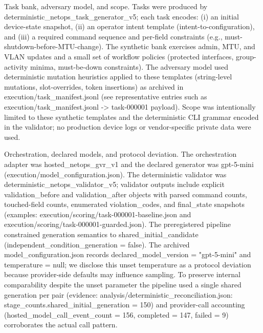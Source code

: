 \documentclass[conference]{IEEEtran}
\begin{document}
Task bank, adversary model, and scope. Tasks were produced by deterministic\_netops\_task\_generator\_v5; each task encodes: (i) an initial device-state snapshot, (ii) an operator intent template (intent-to-configuration), and (iii) a required command sequence and per-field constraints (e.g., must-shutdown-before-MTU-change). The synthetic bank exercises admin, MTU, and VLAN updates and a small set of workflow policies (protected interfaces, group-activity minima, must-be-down constraints). The adversary model used deterministic mutation heuristics applied to these templates (string-level mutations, slot-overrides, token insertions) as archived in execution/task\_manifest.jsonl (see representative entries such as execution/task\_manifest.jsonl -> task-000001 payload). Scope was intentionally limited to these synthetic templates and the deterministic CLI grammar encoded in the validator; no production device logs or vendor-specific private data were used.

Orchestration, declared models, and protocol deviation. The orchestration adapter was hosted\_netops\_gvr\_v1 and the declared generator was gpt-5-mini (execution/model\_configuration.json). The deterministic validator was deterministic\_netops\_validator\_v5; validator outputs include explicit validation\_before and validation\_after objects with parsed command counts, touched-field counts, enumerated violation\_codes, and final\_state snapshots (examples: execution/scoring/task-000001-baseline.json and execution/scoring/task-000001-guarded.json). The preregistered pipeline constrained generation semantics to shared\_initial\_candidate (independent\_condition\_generation = false). The archived model\_configuration.json records declared\_model\_version = "gpt-5-mini" and temperature = null; we disclose this unset temperature as a protocol deviation because provider-side defaults may influence sampling. To preserve internal comparability despite the unset parameter the pipeline used a single shared generation per pair (evidence: analysis/deterministic\_reconciliation.json: stage\_counts.shared\_initial\_generation = 150) and provider-call accounting (hosted\_model\_call\_event\_count = 156, completed = 147, failed = 9) corroborates the actual call pattern.
\end{document}

